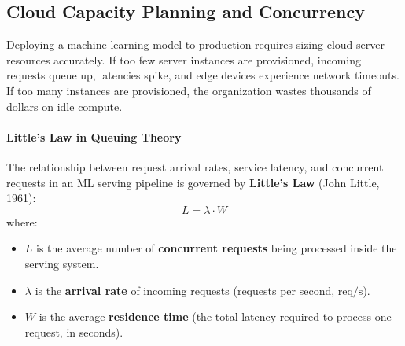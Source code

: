 \subsection{Cloud Capacity Planning and Concurrency}\label{subsec:capacity_planning}

Deploying a machine learning model to production requires sizing cloud server resources accurately. If too few server instances are provisioned, incoming requests queue up, latencies spike, and edge devices experience network timeouts. If too many instances are provisioned, the organization wastes thousands of dollars on idle compute.

\paragraph{Little's Law in Queuing Theory}
The relationship between request arrival rates, service latency, and concurrent requests in an ML serving pipeline is governed by \textbf{Little's Law} (John Little, 1961):
\begin{equation}
L = \lambda \cdot W\label{eq:littles_law}
\end{equation}
where:
\begin{itemize}
    \item $L$ is the average number of \textbf{concurrent requests} being processed inside the serving system.
    \item $\lambda$ is the \textbf{arrival rate} of incoming requests (requests per second, $\text{req/s}$).
    \item $W$ is the average \textbf{residence time} (the total latency required to process one request, in seconds).
\end{itemize}

